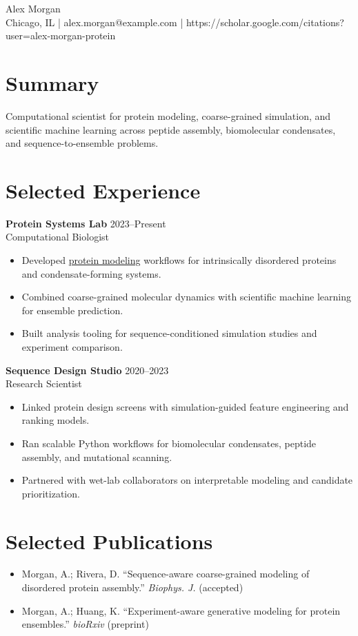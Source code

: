 \documentclass[10pt]{article}
\begin{document}
\begin{center}
  {\LARGE Alex Morgan}\\
  Chicago, IL \quad | \quad alex.morgan@example.com \quad | \quad
  https://scholar.google.com/citations?user=alex-morgan-protein
\end{center}

\section*{Summary}
Computational scientist for protein modeling, coarse-grained simulation, and scientific machine learning
across peptide assembly, biomolecular condensates, and sequence-to-ensemble problems.

\section*{Selected Experience}
\textbf{Protein Systems Lab} \hfill 2023--Present\\
Computational Biologist
\begin{itemize}
  \item Developed \underline{protein modeling} workflows for intrinsically disordered proteins and condensate-forming systems.
  \item Combined coarse-grained molecular dynamics with scientific machine learning for ensemble prediction.
  \item Built analysis tooling for sequence-conditioned simulation studies and experiment comparison.
\end{itemize}

\textbf{Sequence Design Studio} \hfill 2020--2023\\
Research Scientist
\begin{itemize}
  \item Linked protein design screens with simulation-guided feature engineering and ranking models.
  \item Ran scalable Python workflows for biomolecular condensates, peptide assembly, and mutational scanning.
  \item Partnered with wet-lab collaborators on interpretable modeling and candidate prioritization.
\end{itemize}

\section*{Selected Publications}
\begin{itemize}
  \item Morgan, A.; Rivera, D. ``Sequence-aware coarse-grained modeling of disordered protein assembly.'' \textit{Biophys. J.} (accepted)
  \item Morgan, A.; Huang, K. ``Experiment-aware generative modeling for protein ensembles.'' \textit{bioRxiv} (preprint)
\end{itemize}
\end{document}
